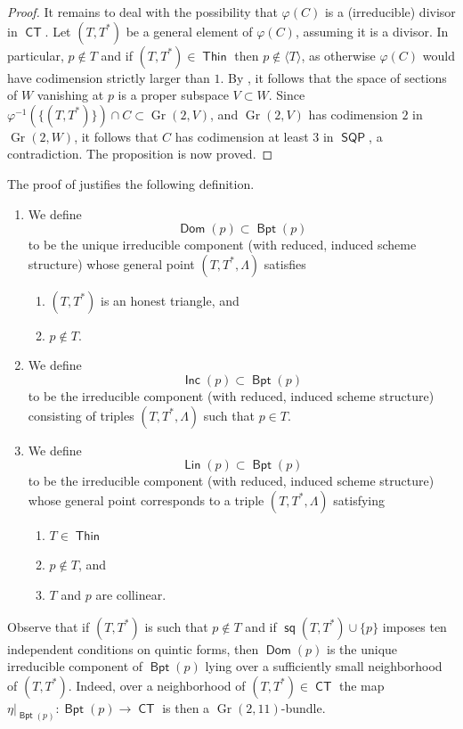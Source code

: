 \documentclass{article}
\DeclareMathOperator{\CT}{\mathsf{CT}}
\DeclareMathOperator{\Thin}{\mathsf{Thin}}
\DeclareMathOperator{\SQP}{\mathsf{SQP}}
\DeclareMathOperator{\Gr}{Gr}
\DeclareMathOperator{\s}{\mathsf{sq}}
\DeclareMathOperator{\BP}{\mathsf{Bpt}}
\DeclareMathOperator{\Dom}{\mathsf{Dom}}
\DeclareMathOperator{\Lin}{\mathsf{Lin}}
\DeclareMathOperator{\Inc}{\mathsf{Inc}}
\begin{document}
\begin{proof}
    It remains to deal with the possibility that $\varphi(C)$ is a (irreducible) divisor in $\CT$. Let $(T,T^{*})$ be a general element of $\varphi(C)$, assuming it is a divisor. In particular, $p \notin T$ and if $(T,T^{*}) \in \Thin$ then $p \notin \langle T \rangle$, as otherwise $\varphi(C)$ would have codimension strictly larger than $1$.  By , it follows that the space of sections of $W$ vanishing at $p$ is a proper subspace $V \subset W$.  Since $\varphi^{-1}(\{(T,T^{*})\}) \cap C \subset \Gr(2,V)$, and $\Gr(2,V)$ has codimension $2$ in $\Gr(2,W)$, it follows that $C$ has codimension at least $3$ in $\SQP$, a contradiction.  The proposition is now proved.
\end{proof}

The proof of  justifies the following definition.

\begin{definition}
  \label{definition:D}
  \begin{enumerate}
    \item    We define \[\Dom (p) \subset \BP (p)\] to be the unique irreducible
  component (with reduced, induced scheme structure) whose general
  point $(T,T^{*},\Lambda)$ satisfies
    \begin{enumerate}
     \item $(T,T^{*})$ is an honest triangle, and
     \item $p \notin T$.
      \end{enumerate} 

    \item  We define \[ \Inc (p) \subset \BP (p) \] to be the irreducible component 
  (with reduced, induced scheme structure) consisting of triples
  $(T,T^{*},\Lambda)$ such that $p \in T$.
    \item  We define \[\Lin (p) \subset \BP (p)\] to
  be the irreducible component (with reduced, induced scheme
  structure) whose general point corresponds to a triple $(T,T^{*}, \Lambda)$ satisfying
  \begin{enumerate}
  \item $T \in \Thin$
  \item $p \notin T$, and
  \item $T$ and $p$ are collinear.
  \end{enumerate}
  \end{enumerate}
\end{definition}

\begin{remark}
    \label{remark:Dombundle} Observe that if $(T,T^{*})$ is such that $p \notin T$ and if $\s(T,T^{*}) \cup \{p\}$ imposes ten independent conditions on quintic forms, then $\Dom(p)$ is the unique irreducible component of $\BP(p)$ lying over a sufficiently small neighborhood of $(T,T^{*})$.  Indeed, over a neighborhood of $(T,T^{*}) \in \CT$ the map $\eta|_{\BP(p)}: \BP(p) \to \CT$ is then a $\Gr(2,11)$-bundle.
\end{remark}
\end{document}
